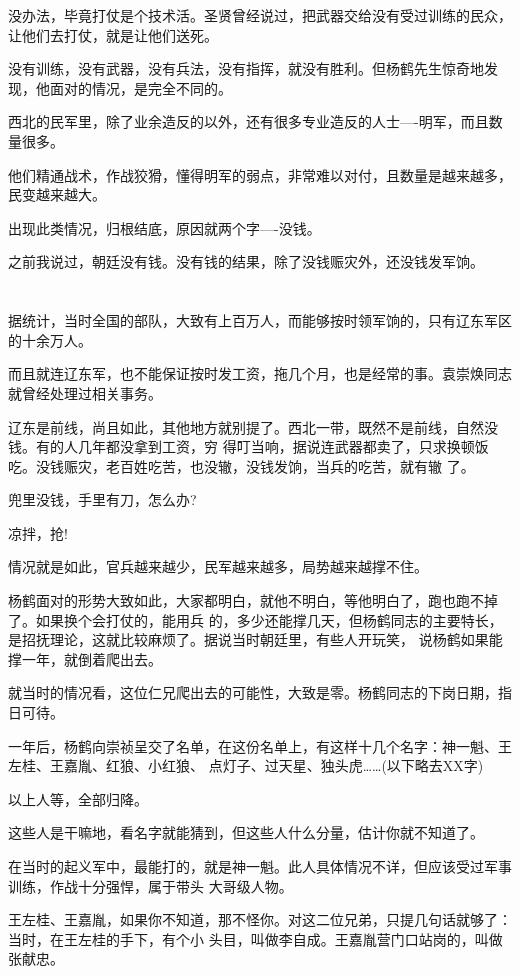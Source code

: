 \documentclass[11pt,a4paper,onecolumn]{article}
\begin{document}
没办法，毕竟打仗是个技术活。圣贤曾经说过，把武器交给没有受过训练的民众，让他们去打仗，就是让他们送死。

没有训练，没有武器，没有兵法，没有指挥，就没有胜利。但杨鹤先生惊奇地发现，他面对的情况，是完全不同的。

西北的民军里，除了业余造反的以外，还有很多专业造反的人士----明军，而且数量很多。

他们精通战术，作战狡猾，懂得明军的弱点，非常难以对付，且数量是越来越多，民变越来越大。

出现此类情况，归根结底，原因就两个字----没钱。

之前我说过，朝廷没有钱。没有钱的结果，除了没钱赈灾外，还没钱发军饷。

\section[\thesection]{}

据统计，当时全国的部队，大致有上百万人，而能够按时领军饷的，只有辽东军区的十余万人。

而且就连辽东军，也不能保证按时发工资，拖几个月，也是经常的事。袁崇焕同志就曾经处理过相关事务。

辽东是前线，尚且如此，其他地方就别提了。西北一带，既然不是前线，自然没钱。有的人几年都没拿到工资，穷
得叮当响，据说连武器都卖了，只求换顿饭吃。没钱赈灾，老百姓吃苦，也没辙，没钱发饷，当兵的吃苦，就有辙
了。

兜里没钱，手里有刀，怎么办?

凉拌，抢!

情况就是如此，官兵越来越少，民军越来越多，局势越来越撑不住。

杨鹤面对的形势大致如此，大家都明白，就他不明白，等他明白了，跑也跑不掉了。如果换个会打仗的，能用兵
的，多少还能撑几天，但杨鹤同志的主要特长，是招抚理论，这就比较麻烦了。据说当时朝廷里，有些人开玩笑，
说杨鹤如果能撑一年，就倒着爬出去。

就当时的情况看，这位仁兄爬出去的可能性，大致是零。杨鹤同志的下岗日期，指日可待。

一年后，杨鹤向崇祯呈交了名单，在这份名单上，有这样十几个名字：神一魁、王左桂、王嘉胤、红狼、小红狼、
点灯子、过天星、独头虎……(以下略去XX字)

以上人等，全部归降。

这些人是干嘛地，看名字就能猜到，但这些人什么分量，估计你就不知道了。

在当时的起义军中，最能打的，就是神一魁。此人具体情况不详，但应该受过军事训练，作战十分强悍，属于带头
大哥级人物。

王左桂、王嘉胤，如果你不知道，那不怪你。对这二位兄弟，只提几句话就够了：当时，在王左桂的手下，有个小
头目，叫做李自成。王嘉胤营门口站岗的，叫做张献忠。
\end{document}
